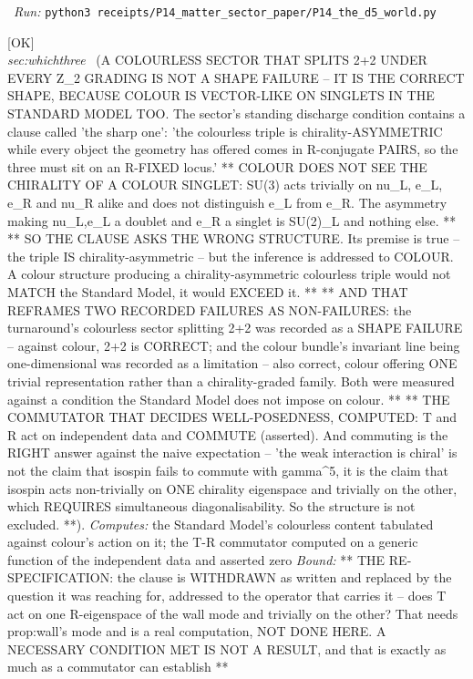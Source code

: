 \begin{description}
\ \emph{Run:} \texttt{python3 receipts/P14\_matter\_sector\_paper/P14\_the\_d5\_world.py}
\item[\label{rcpt:P14_colour_is_vector_like_on_singlets}\texttt{P14\_colour\_is\_vector\_like\_on\_singlets}]\hfill\textsf{[OK]}\\
\textit{sec:whichthree} \ (A COLOURLESS SECTOR THAT SPLITS 2+2 UNDER EVERY Z\_2 GRADING IS NOT A SHAPE FAILURE -- IT IS THE CORRECT SHAPE, BECAUSE COLOUR IS VECTOR-LIKE ON SINGLETS IN THE STANDARD MODEL TOO. The sector's standing discharge condition contains a clause called 'the sharp one': 'the colourless triple is chirality-ASYMMETRIC while every object the geometry has offered comes in R-conjugate PAIRS, so the three must sit on an R-FIXED locus.' ** COLOUR DOES NOT SEE THE CHIRALITY OF A COLOUR SINGLET: SU(3) acts trivially on nu\_L, e\_L, e\_R and nu\_R alike and does not distinguish e\_L from e\_R. The asymmetry making nu\_L,e\_L a doublet and e\_R a singlet is SU(2)\_L and nothing else. ** ** SO THE CLAUSE ASKS THE WRONG STRUCTURE. Its premise is true -- the triple IS chirality-asymmetric -- but the inference is addressed to COLOUR. A colour structure producing a chirality-asymmetric colourless triple would not MATCH the Standard Model, it would EXCEED it. ** ** AND THAT REFRAMES TWO RECORDED FAILURES AS NON-FAILURES: the turnaround's colourless sector splitting 2+2 was recorded as a SHAPE FAILURE -- against colour, 2+2 is CORRECT; and the colour bundle's invariant line being one-dimensional was recorded as a limitation -- also correct, colour offering ONE trivial representation rather than a chirality-graded family. Both were measured against a condition the Standard Model does not impose on colour. ** ** THE COMMUTATOR THAT DECIDES WELL-POSEDNESS, COMPUTED: T and R act on independent data and COMMUTE (asserted). And commuting is the RIGHT answer against the naive expectation -- 'the weak interaction is chiral' is not the claim that isospin fails to commute with gamma\textasciicircum{}5, it is the claim that isospin acts non-trivially on ONE chirality eigenspace and trivially on the other, which REQUIRES simultaneous diagonalisability. So the structure is not excluded. **). 
\emph{Computes:} the Standard Model's colourless content tabulated against colour's action on it; the T-R commutator computed on a generic function of the independent data and asserted zero
 \emph{Bound:} ** THE RE-SPECIFICATION: the clause is WITHDRAWN as written and replaced by the question it was reaching for, addressed to the operator that carries it -- does T act on one R-eigenspace of the wall mode and trivially on the other? That needs prop:wall's mode and is a real computation, NOT DONE HERE. A NECESSARY CONDITION MET IS NOT A RESULT, and that is exactly as much as a commutator can establish **

\end{description}
